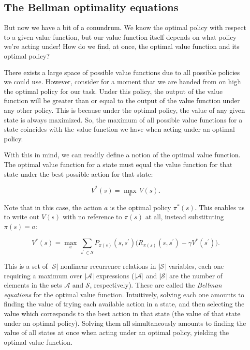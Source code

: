 \documentclass[12pt]{article}
\begin{document}
\subsection{The Bellman optimality equations}

But now we have a bit of a conundrum. We know the optimal policy with respect to a given value function, but our value function itself depends on what policy we're acting under! How do we find, at once, the optimal value function and its optimal policy?

There exists a large space of possible value functions due to all possible policies we could use. However, consider for a moment that we are handed from on high the optimal policy for our task. Under this policy, the output of the value function will be greater than or equal to the output of the value function under any other policy. This is because under the optimal policy, the value of any given state is always maximized. So, the maximum of all possible value functions for a state coincides with the value function we have when acting under an optimal policy.

With this in mind, we can readily define a notion of the optimal value function. The optimal value function for a state must equal the value function for that state under the best possible action for that state:

\begin{equation}
V^*(s) = \underset{a}{\max} \, V(s).
\end{equation}

Note that in this case, the action $a$ is the optimal policy $\pi^*(s)$. This enables us to write out $V(s)$ with no reference to $\pi(s)$ at all, instead substituting $\pi(s) = a$:

\begin{equation}
V^*(s) = \underset{a}{\max} \, \sum_{s^\prime \in \mathscr{S}} P_{\pi(s)}(s, s^\prime) \Big(R_{\pi(s)}(s, s^\prime) + \gamma V^*(s^\prime)\Big).
\end{equation}

This is a set of $|\mathscr{S}|$ nonlinear recurrence relations in $|\mathscr{S}|$ variables\footnotemark, each one requiring a maximum over $|\mathscr{A}|$ expressions ($|\mathscr{A}|$ and $|\mathscr{S}|$ are the number of elements in the sets $\mathscr{A}$ and $\mathscr{S}$, respectively). These are called the \emph{Bellman equations} for the optimal value function. Intuitively, solving each one amounts to finding the value of trying each available action in a state, and then selecting the value which corresponds to the best action in that state (the value of that state under an optimal policy). Solving them all simultaneously amounts to finding the value of all states at once when acting under an optimal policy, yielding the optimal value function.
\end{document}
